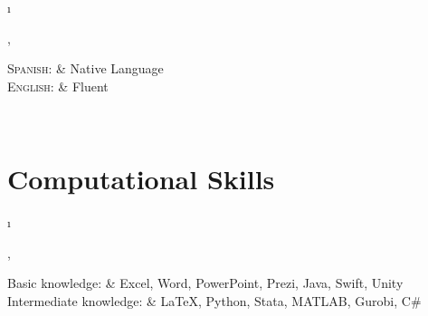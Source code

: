 \documentclass[a4paper,10pt]{article}
\newcommand{\tablength}{}
\newcommand{\setTabParams}[1]{\renewcommand\tablength{}\forcsvlist{\listadd\tablength}{#1}}
\newcommand{\setCols}[1]{			%
	\ifnum0=\i						%
		\ifdim0cm=#1				%
			\def \firstCol {r}		%
		\else						%
			\def \firstCol {p{#1}}		%
		\fi						%
	\else \ifnum1=\i				%
		\ifdim0cm=#1				%
			\def \secondCol {l}		%
		\else						%
			\def \secondCol{p{#1}}	%
		\fi						%
	\else \ifnum2=\i				%
		\ifnum0=#1				%
			\def \sep {}			%
		\else						%
			\def \sep {|}			%
		\fi						%
	\fi \fi \fi						%
	\advance\i by1					%
}
\newcommand{\tab}[1]{					%
	\newcount\i						%
	\forlistloop{\setCols}{\tablength}		%
	\begin{tabular}{\firstCol \sep \secondCol}	%
		#1							%
	\end{tabular} \\						%
}
\begin{document}
\tab{
\textsc{Spanish:}
	&	Native Language	\\

\textsc{English:}
	&	Fluent	\\
}


\section{Computational Skills}
\setTabParams{0cm,0cm,0}

\tab{
Basic knowledge:
	& Excel, Word, PowerPoint, Prezi, Java, Swift, Unity 	\\

Intermediate knowledge:
	& {\fb \LaTeX}, Python, Stata, MATLAB, Gurobi, C\#	\\
}


%		
%		
\end{document}
